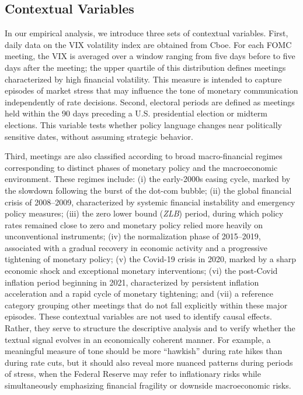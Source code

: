 \documentclass{article}
\begin{document}
\subsection{Contextual Variables}

In our empirical analysis, we introduce three sets of contextual variables. First, daily data on the VIX volatility index are obtained from Cboe. For each FOMC meeting, the VIX is averaged over a window ranging from 
five days before to five days after the meeting; the upper quartile of this distribution defines meetings characterized by high financial volatility. This measure is intended to capture episodes of market stress that may influence 
the tone of monetary communication independently of rate decisions.
Second, electoral periods are defined as meetings held within the 90 days preceding a U.S. presidential election or midterm elections. This 
variable tests whether policy language changes near politically sensitive dates, without assuming strategic behavior.

Third, meetings are also classified according to broad macro-financial regimes corresponding to distinct phases of monetary policy and the macroeconomic environment. These regimes include: (i) the early-2000s easing cycle, marked 
by the slowdown following the burst of the dot-com bubble; (ii) the global financial crisis of 2008--2009, characterized by systemic financial instability and emergency policy measures; (iii) the zero lower bound (\textit{ZLB}) period, 
during which policy rates remained close to zero and monetary policy relied more heavily on unconventional instruments; (iv) the normalization phase of 2015--2019, associated with a gradual recovery in economic activity and a 
progressive tightening of monetary policy; (v) the Covid-19 crisis in 2020, marked by a sharp economic shock and exceptional monetary interventions; (vi) the post-Covid inflation period beginning in 2021, characterized by persistent 
inflation acceleration and a rapid cycle of monetary tightening; and (vii) a reference category grouping other meetings that do not fall explicitly within these major episodes.
These contextual variables are not used to identify causal effects. Rather, they serve to structure the descriptive analysis and to verify whether the textual signal evolves in an economically coherent manner. For example, a 
meaningful measure of tone should be more ``hawkish'' during rate hikes than during rate cuts, but it should also reveal more nuanced patterns during periods of stress, when the Federal Reserve may refer to inflationary risks while 
simultaneously emphasizing financial fragility or downside macroeconomic risks.
\end{document}
